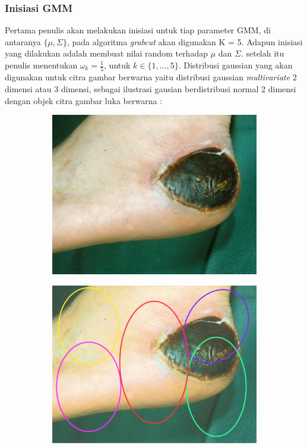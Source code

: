 \subsubsection{Inisiasi GMM}

Pertama penulis akan melakukan inisiasi untuk tiap parameter GMM, di antaranya 
\(\{\mu, \Sigma \}\), pada algoritma \emph{grabcut} akan digunakan K = 5. Adapun
inisiasi yang dilakukan adalah membuat nilai random terhadap \(\mu\) dan \(\Sigma\).
setelah itu penulis menentukan \(\omega_k = \frac{1}{5}\), untuk \(k \in \{1, ..., 5\}\).
Distribusi gaussian yang akan digunakan untuk citra gambar berwarna yaitu distribusi 
gaussian \emph{multivariate} 2 dimensi atau 3 dimensi, sebagai ilustrasi gausian berdistribusi 
normal 2 dimensi dengan objek citra gambar luka berwarna :

\begin{figure}[H]
	\centering
	  \begin{subfigure}{0.4\textwidth}
		\centering{}
		\includegraphics[width=\textwidth]{gambar/gambar-3_2(b).jpg}
		\caption{}
	\end{subfigure}\hfill%
	  \begin{subfigure}{0.4\textwidth}
		\centering{}
		\includegraphics[width=\textwidth]{gambar/gambar-3_7.png}

\end{subfigure}
\end{figure}
